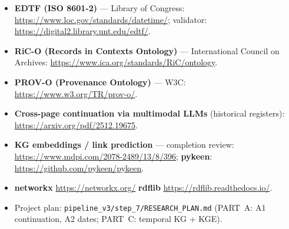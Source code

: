 \documentclass[11pt]{article}
\newcommand{\code}[1]{\texttt{\small #1}}
\begin{document}
\begin{itemize}[leftmargin=1.4em]
  \item \textbf{EDTF (ISO 8601-2)} --- Library of Congress:
        \url{https://www.loc.gov/standards/datetime/};
        validator: \url{https://digital2.library.unt.edu/edtf/}.
  \item \textbf{RiC-O (Records in Contexts Ontology)} --- International Council on Archives:
        \url{https://www.ica.org/standards/RiC/ontology}.
  \item \textbf{PROV-O (Provenance Ontology)} --- W3C: \url{https://www.w3.org/TR/prov-o/}.
  \item \textbf{Cross-page continuation via multimodal LLMs} (historical registers):
        \url{https://arxiv.org/pdf/2512.19675}.
  \item \textbf{KG embeddings / link prediction} --- completion review:
        \url{https://www.mdpi.com/2078-2489/13/8/396}; \textbf{pykeen}:
        \url{https://github.com/pykeen/pykeen}.
  \item \textbf{networkx} \url{https://networkx.org/} \quad \textbf{rdflib}
        \url{https://rdflib.readthedocs.io/}.
  \item Project plan: \code{pipeline\_v3/step\_7/RESEARCH\_PLAN.md} (PART~A: A1 continuation, A2 dates;
        PART~C: temporal KG + KGE).
\end{itemize}

\end{document}

